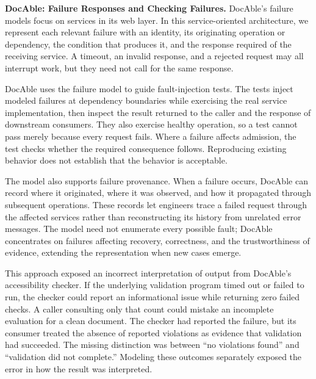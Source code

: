 \textbf{DocAble: Failure Responses and Checking Failures.} DocAble's failure models focus on services in its web layer. In this service-oriented architecture, we represent each relevant failure with an identity, its originating operation or dependency, the condition that produces it, and the response required of the receiving service. A timeout, an invalid response, and a rejected request may all interrupt work, but they need not call for the same response.

DocAble uses the failure model to guide fault-injection tests. The tests inject modeled failures at dependency boundaries while exercising the real service implementation, then inspect the result returned to the caller and the response of downstream consumers. They also exercise healthy operation, so a test cannot pass merely because every request fails. Where a failure affects admission, the test checks whether the required consequence follows. Reproducing existing behavior does not establish that the behavior is acceptable.

The model also supports failure provenance. When a failure occurs, DocAble can record where it originated, where it was observed, and how it propagated through subsequent operations. These records let engineers trace a failed request through the affected services rather than reconstructing its history from unrelated error messages. The model need not enumerate every possible fault; DocAble concentrates on failures affecting recovery, correctness, and the trustworthiness of evidence, extending the representation when new cases emerge.

This approach exposed an incorrect interpretation of output from DocAble's accessibility checker. If the underlying validation program timed out or failed to run, the checker could report an informational issue while returning zero failed checks. A caller consulting only that count could mistake an incomplete evaluation for a clean document. The checker had reported the failure, but its consumer treated the absence of reported violations as evidence that validation had succeeded. The missing distinction was between ``no violations found'' and ``validation did not complete.'' Modeling these outcomes separately exposed the error in how the result was interpreted.

